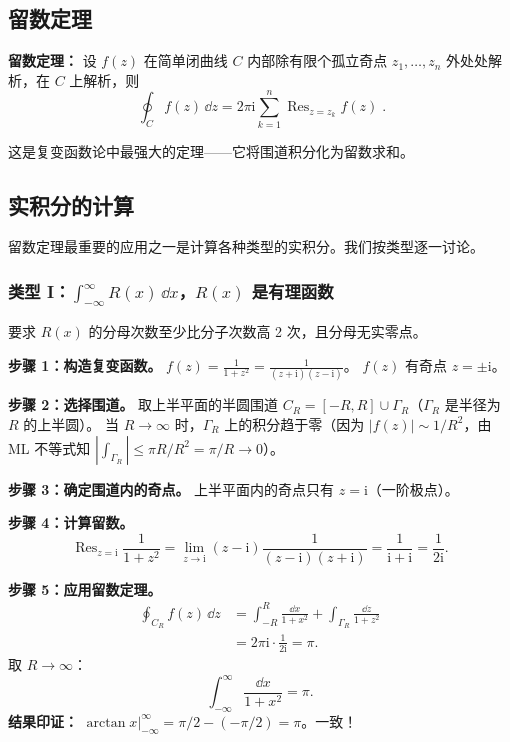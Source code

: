 \subsection{留数定理}

\textbf{留数定理：} 设 $f(z)$ 在简单闭曲线 $C$ 内部除有限个孤立奇点 $z_1,\dots,z_n$ 外处处解析，在 $C$ 上解析，则
\begin{equation}
\boxed{\;\oint_C f(z)\,\dd z = 2\pi\mathrm{i}\sum_{k=1}^n
\mathop{\mathrm{Res}}_{z=z_k} f(z)\;}.
\label{eq:residue_theorem}
\end{equation}

这是复变函数论中最强大的定理——它将围道积分化为留数求和。

\subsection{实积分的计算}

留数定理最重要的应用之一是计算各种类型的实积分。我们按类型逐一讨论。

\subsubsection{\texorpdfstring{类型 I：$\int_{-\infty}^{\infty} R(x)\,\dd x$，$R(x)$ 是有理函数}{类型 I：∫R(x)dx，R(x) 是有理函数}}

要求 $R(x)$ 的分母次数至少比分子次数高 2 次，且分母无实零点。

\begin{example}
\textbf{步骤 1：构造复变函数。}
$f(z) = \frac{1}{1+z^2} = \frac{1}{(z+\mathrm{i})(z-\mathrm{i})}$。
$f(z)$ 有奇点 $z=\pm\mathrm{i}$。

\textbf{步骤 2：选择围道。}
取上半平面的半圆围道 $C_R = [-R,R] \cup \Gamma_R$（$\Gamma_R$ 是半径为 $R$ 的上半圆）。
当 $R\to\infty$ 时，$\Gamma_R$ 上的积分趋于零（因为 $|f(z)|\sim 1/R^2$，由 ML 不等式知 $|\int_{\Gamma_R}| \leq \pi R / R^2 = \pi/R \to 0$）。

\textbf{步骤 3：确定围道内的奇点。}
上半平面内的奇点只有 $z=\mathrm{i}$（一阶极点）。

\textbf{步骤 4：计算留数。}
\begin{equation}
\mathop{\mathrm{Res}}_{z=\mathrm{i}} \frac{1}{1+z^2}
= \lim_{z\to\mathrm{i}} (z-\mathrm{i})\frac{1}{(z-\mathrm{i})(z+\mathrm{i})}
= \frac{1}{\mathrm{i}+\mathrm{i}} = \frac{1}{2\mathrm{i}}.
\end{equation}

\textbf{步骤 5：应用留数定理。}
\begin{align*}
\oint_{C_R} f(z)\,\dd z
&= \int_{-R}^{R} \frac{\dd x}{1+x^2} + \int_{\Gamma_R} \frac{\dd z}{1+z^2} \\
&= 2\pi\mathrm{i} \cdot \frac{1}{2\mathrm{i}} = \pi.
\end{align*}
取 $R\to\infty$：
\begin{equation}
\int_{-\infty}^{\infty} \frac{\dd x}{1+x^2} = \pi.
\end{equation}
\textbf{结果印证：} $\arctan x|_{-\infty}^{\infty} = \pi/2 - (-\pi/2) = \pi$。一致！
\end{example}

